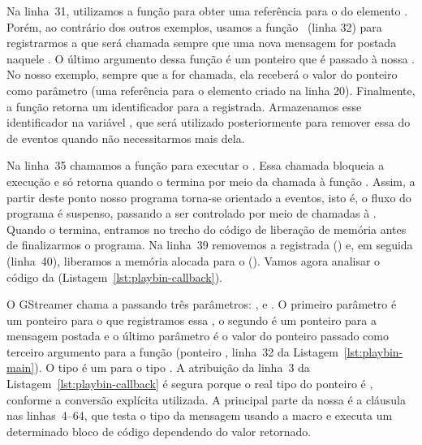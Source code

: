 Na linha~31, utilizamos a função  para obter uma
referência para o  do elemento . Porém, ao contrário dos
outros exemplos, usamos a função
~(linha 32) para registrarmos
a   que será chamada sempre que uma nova mensagem
for postada naquele . O último argumento dessa função é um ponteiro
que é passado à nossa . No nosso exemplo, sempre que a
  for chamada, ela receberá o valor do ponteiro 
 como parâmetro (uma referência para o elemento  criado
na linha 20). Finalmente, a função 
retorna um identificador para a  registrada. Armazenamos esse
identificador na variável , que será utilizado posteriormente para
remover essa  do  de eventos quando não necessitarmos
mais dela.

Na linha~35 chamamos a função  para executar o
. Essa chamada bloqueia a execução e só retorna quando o 
termina por meio da chamada à função . Assim, a partir
deste ponto nosso programa torna-se orientado a eventos, isto é, o fluxo do
programa é suspenso, passando a ser controlado por meio de chamadas à 
 . Quando o  termina, entramos no trecho
do código de liberação de memória antes de finalizarmos o programa. Na linha~39
removemos a  registrada () e, em seguida
(linha~40), liberamos a memória alocada para o 
(). Vamos agora analisar o código da  
 (Listagem~\ref{lst:playbin-callback}).



O GStreamer chama a   passando três parâmetros:
,  e . O primeiro parâmetro é um ponteiro para o 
que registramos essa , o segundo é um ponteiro para a mensagem
postada e o último parâmetro é o valor do ponteiro passado como terceiro
argumento para a função  (ponteiro , linha~32
da Listagem~\ref{lst:playbin-main}). O tipo  é um  para
o tipo . A atribuição da linha~3 da
Listagem~\ref{lst:playbin-callback} é segura porque o real tipo do ponteiro
 é , conforme a conversão explícita utilizada.
A principal parte da nossa  é a cláusula  nas
linhas~4--64, que testa o tipo da mensagem usando a macro 
e executa um determinado bloco de código dependendo do valor retornado. 


